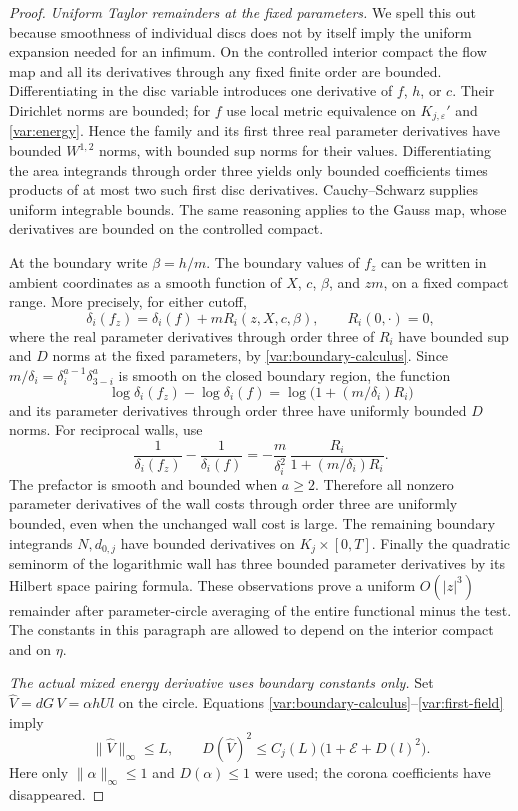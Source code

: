 \documentclass[11pt]{article}
\theoremstyle{definition}
\theoremstyle{remark}
\newcommand{\eps}{\varepsilon}
\numberwithin{equation}{section}
\begin{document}
\begin{proof}
\emph{Uniform Taylor remainders at the fixed parameters.}
We spell this out because smoothness of individual discs does not by
itself imply the uniform expansion needed for an infimum.
On the controlled interior compact the flow map and all its derivatives
through any fixed finite order are bounded.  Differentiating in the
disc variable introduces one derivative of $f$, $h$, or $c$.
Their Dirichlet norms are bounded; for $f$ use local metric equivalence
on $K_{j,\eps}'$ and \eqref{var:energy}.  Hence the family and its first
three real parameter derivatives have bounded $W^{1,2}$ norms, with
bounded sup norms for their values.  Differentiating the area integrands
through order three yields only bounded coefficients times products of
at most two such first disc derivatives.  Cauchy--Schwarz supplies
uniform integrable bounds.  The same reasoning applies to the Gauss
map, whose derivatives are bounded on the controlled compact.

At the boundary write $\beta=h/m$.  The boundary values of $f_z$ can
be written in ambient coordinates as a smooth function of $X$, $c$,
$\beta$, and $z m$, on a fixed compact range.  More precisely, for
either cutoff,
\[
 \delta_i(f_z)=\delta_i(f)+m R_i(z,X,c,\beta),\qquad R_i(0,\cdot)=0,
\]
where the real parameter derivatives through order three of $R_i$
have bounded sup and $D$ norms at the fixed parameters, by
\eqref{var:boundary-calculus}.  Since
$m/\delta_i=\delta_i^{a-1}\delta_{3-i}^{a}$ is smooth on the closed
boundary region, the function
\[
 \log\delta_i(f_z)-\log\delta_i(f)
 =\log\bigl(1+(m/\delta_i)R_i\bigr)
\]
and its parameter derivatives through order three have uniformly
bounded $D$ norms.  For reciprocal walls, use
\[
 \frac1{\delta_i(f_z)}-\frac1{\delta_i(f)}
 =-\frac{m}{\delta_i^2}\,
 \frac{R_i}{1+(m/\delta_i)R_i}.
\]
The prefactor is smooth and bounded when $a\ge2$.  Therefore all
nonzero parameter derivatives of the wall costs through order three
are uniformly bounded, even when the unchanged wall cost is large.
The remaining boundary integrands $N,d_{0,j}$ have bounded derivatives
on $K_j\times[0,T]$.  Finally the quadratic seminorm of the logarithmic
wall has three bounded parameter derivatives by its Hilbert space
pairing formula.  These observations prove a uniform $O(|z|^3)$
remainder after parameter-circle averaging of the entire functional
minus the test.  The constants in this paragraph are allowed to depend
on the interior compact and on $\eta$.

\emph{The actual mixed energy derivative uses boundary constants only.}
Set $\widehat V=dG\,V=\alpha hUl$ on the circle.  Equations
\eqref{var:boundary-calculus}--\eqref{var:first-field} imply
\begin{equation}
 \|\widehat V\|_\infty\le L,
 \qquad D(\widehat V)^2\le
 C_j(L)\bigl(1+\mathcal E+D(l)^2\bigr).
 \label{var:first-field-bound}
\end{equation}
Here only $\|\alpha\|_\infty\le1$ and $D(\alpha)\le1$ were used;
the corona coefficients have disappeared.


\end{proof}
\end{document}
